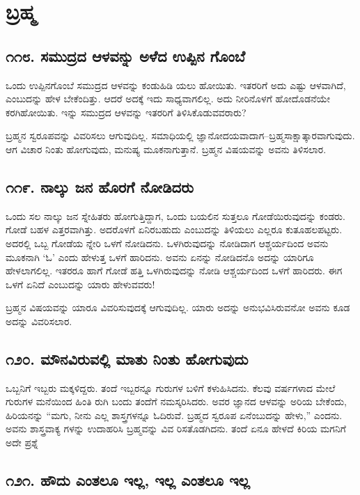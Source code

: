 
\chapter{ಬ್ರಹ್ಮ}

\section{\num{೧೧೮. } ಸಮುದ್ರದ ಆಳವನ್ನು ಅಳೆದ ಉಪ್ಪಿನ ಗೊಂಬೆ}

ಒಂದು ಉಪ್ಪಿನಗೊಂಬೆ ಸಮುದ್ರದ ಆಳವನ್ನು ಕಂಡುಹಿಡಿ ಯಲು ಹೋಯಿತು. ಇತರರಿಗೆ ಅದು ಎಷ್ಟು ಆಳವಾಗಿದೆ, ಎಂಬುದನ್ನು ಹೇಳ ಬೇಕೆಂದಿತ್ತು. ಆದರೆ ಅದಕ್ಕೆ ಇದು ಸಾಧ್ಯವಾಗಲಿಲ್ಲ. ಅದು ನೀರಿನೊಳಗೆ ಹೋದೊಡನೆಯೇ ಕರಗಿಹೋಯಿತು. ಇನ್ನು ಸಮುದ್ರದ ಆಳವನ್ನು ಇತರರಿಗೆ ತಿಳಿಸಿಕೊಡುವವರಾರು?

ಬ್ರಹ್ಮನ ಸ್ವರೂಪವನ್ನು ವಿವರಿಸಲು ಆಗುವುದಿಲ್ಲ. ಸಮಾಧಿಯಲ್ಲಿ ಜ್ಞಾನೋದಯವಾದಾಗ–ಬ್ರಹ್ಮಸಾಕ್ಷಾತ್ಕಾರವಾಗುವುದು. ಆಗ ವಿಚಾರ ನಿಂತು ಹೋಗುವುದು, ಮನುಷ್ಯ ಮೂಕನಾಗುತ್ತಾನೆ. ಬ್ರಹ್ಮನ ವಿಷಯವನ್ನು ಅವನು ತಿಳಿಸಲಾರ.


\section{\num{೧೧೯. } ನಾಲ್ಕು ಜನ ಹೊರಗೆ ನೋಡಿದರು}

ಒಂದು ಸಲ ನಾಲ್ಕು ಜನ ಸ್ನೇಹಿತರು ಹೋಗುತ್ತಿದ್ದಾಗ, ಒಂದು ಬಯಲಿನ ಸುತ್ತಲೂ ಗೋಡೆಯಿರುವುದನ್ನು ಕಂಡರು. ಗೋಡೆ ಬಹಳ ಎತ್ತರವಾಗಿತ್ತು. ಅದರೊಳಗೆ ಏನಿರಬಹುದು ಎಂಬುದನ್ನು ತಿಳಿಯಲು ಎಲ್ಲರೂ ಕುತೂಹಲಪಟ್ಟರು. ಅದರಲ್ಲಿ ಒಬ್ಬ ಗೋಡೆಯ ನ್ನೇರಿ ಒಳಗೆ ನೋಡಿದನು. ಒಳಗಿರುವುದನ್ನು ನೋಡಿದಾಗ ಆಶ್ಚರ್ಯದಿಂದ ಅವನು ಮೂಕನಾಗಿ ‘ಓ’ ಎಂದು ಹೇಳುತ್ತ ಒಳಗೆ ಹಾರಿದನು. ಅವನು ಏನನ್ನು ನೋಡಿದನೊ ಅದನ್ನು ಯಾರಿಗೂ ಹೇಳಲಾಗಲಿಲ್ಲ. ಇತರರೂ ಹಾಗೆ ಗೋಡೆ ಹತ್ತಿ ಒಳಗಿರುವುದನ್ನು ನೋಡಿ ಆಶ್ಚರ್ಯದಿಂದ ಒಳಗೆ ಹಾರಿದರು. ಈಗ ಒಳಗೆ ಏನಿದೆ ಎಂಬುದನ್ನು ಯಾರು ಹೇಳುವವರು!

ಬ್ರಹ್ಮನ ವಿಷಯವನ್ನು ಯಾರೂ ವಿವರಿಸುವುದಕ್ಕೆ ಆಗುವುದಿಲ್ಲ. ಯಾರು ಅದನ್ನು ಅನುಭವಿಸಿರುವನೋ ಅವನು ಕೂಡ ಅದನ್ನು ವಿವರಿಸಲಾರ.


\section{\num{೧೨೦. } ಮೌನವಿರುವಲ್ಲಿ ಮಾತು ನಿಂತು ಹೋಗುವುದು}

ಒಬ್ಬನಿಗೆ ಇಬ್ಬರು ಮಕ್ಕಳಿದ್ದರು. ತಂದೆ ಇಬ್ಬರನ್ನೂ ಗುರುಗಳ ಬಳಿಗೆ ಕಳುಹಿಸಿದನು. ಕೆಲವು ವರ್ಷಗಳಾದ ಮೇಲೆ ಗುರುಗಳ ಮನೆಯಿಂದ ಹಿಂತಿ ರುಗಿ ಬಂದು ತಂದೆಗೆ ನಮಸ್ಕರಿಸಿದರು. ಅವರ ಜ್ಞಾನದ ಆಳವನ್ನು ಅರಿಯ ಬೇಕೆಂದು, ಹಿರಿಯನನ್ನು “ಮಗು, ನೀನು ಎಲ್ಲ ಶಾಸ್ತ್ರಗಳನ್ನೂ ಓದಿರುವೆ. ಬ್ರಹ್ಮದ ಸ್ವರೂಪ ಏನೆಂಬುದನ್ನು ಹೇಳು,” ಎಂದನು. ಅವನು ಶಾಸ್ತ್ರವಾಕ್ಯ ಗಳನ್ನು ಉದಾಹರಿಸಿ ಬ್ರಹ್ಮವನ್ನು ವಿವ ರಿಸತೊಡಗಿದನು. ತಂದೆ ಏನೂ ಹೇಳದೆ ಕಿರಿಯ ಮಗನಿಗೆ ಅದೇ ಪ್ರಶ್ನೆ



\section{\num{೧೨೧. } ಹೌದು ಎಂತಲೂ ಇಲ್ಲ, ಇಲ್ಲ ಎಂತಲೂ ಇಲ್ಲ}

